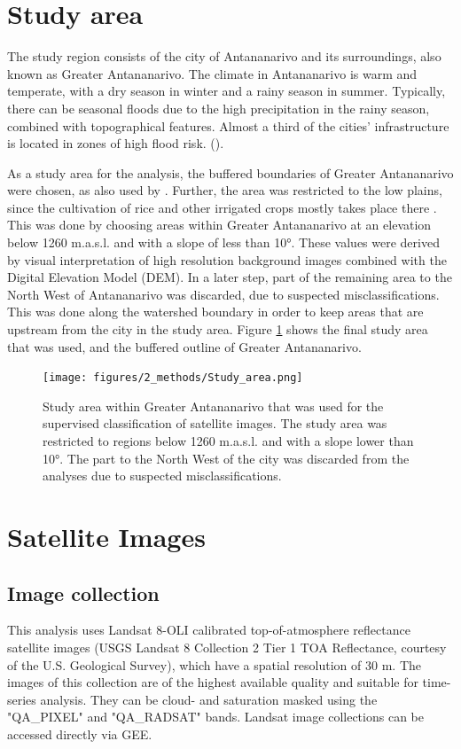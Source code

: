 \documentclass[11pt, A4, oneside]{report}
\begin{document}
\section{Study area}
The study region consists of the city of Antananarivo and its surroundings, also known as Greater Antananarivo. The climate in Antananarivo is warm and temperate, with a dry season in winter and a rainy season in summer. Typically, there can be seasonal floods due to the high precipitation in the rainy season, combined with topographical features. Almost a third of the cities' infrastructure is located in zones of high flood risk. (\cite{Ramiaramanana.2021}).  

As a study area for the analysis, the buffered boundaries of Greater Antananarivo were chosen, as also used by \citet{Dupuy.2020a}. Further, the area was restricted to the low plains, since the cultivation of rice and other irrigated crops mostly takes place there \parencite{Aubry.2012}. This was done by choosing areas within Greater Antananarivo at an elevation below 1260 m.a.s.l. and with a slope of less than 10°. These values were derived by visual interpretation of high resolution background images combined with the Digital Elevation Model (DEM). 
In a later step,  part of the remaining area to the North West of Antananarivo was discarded, due to suspected misclassifications. This was done along the watershed boundary in order to keep areas that are upstream from the city in the study area. Figure \ref{fig:studyarea} shows the final study area that was used, and the buffered outline of Greater Antananarivo.

\begin{figure}[H]
\texttt{[image: figures/2\_methods/Study\_area.png]}
\caption{Study area within Greater Antananarivo that was used for the supervised classification of satellite images. The study area was restricted to regions below 1260 m.a.s.l. and with a slope lower than 10°. The part to the North West of the city was discarded from the analyses due to suspected misclassifications.}
\label{fig:studyarea}
\end{figure}

\section{Satellite Images}

\subsection{Image collection}
This analysis uses Landsat 8-OLI  calibrated top-of-atmosphere reflectance satellite images (USGS Landsat 8 Collection 2 Tier 1 TOA Reflectance, courtesy of the U.S. Geological Survey), which have a spatial resolution of 30 m. The images of this collection are of the highest available quality and suitable for time-series analysis. They can be cloud- and saturation masked using the "QA\_PIXEL" and "QA\_RADSAT" bands. Landsat image collections can be accessed directly via GEE. 
\end{document}

